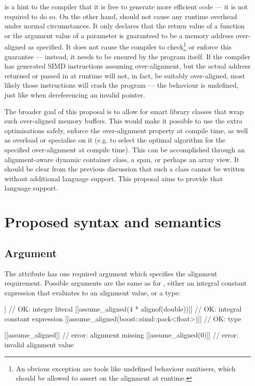  is a hint to the compiler that it is free to generate more efficient code --- it is not required to do so. On the other hand,  should not cause any runtime overhead under normal circumstances. It only declares that the return value of a function or the argument value of a parameter is guaranteed to be a memory address over-aligned as specified. It does not cause the compiler to check\footnote{An obvious exception are tools like undefined behaviour sanitisers, which should be allowed to assert on the alignment at runtime.}   or enforce this guarantee --- instead, it needs to be ensured by the program itself. If the compiler has generated SIMD instructions assuming over-alignment, but the actual address returned or passed in at runtime will not, in fact, be suitably over-aligned, most likely those instructions will crash the program --- the behaviour is undefined, just like when dereferencing an invalid pointer.

The broader goal of this proposal is to allow for smart library classes that wrap such over-aligned memory buffers. This would make it possible to use the extra optimisations safely, enforce the over-alignment property at compile time, as well as overload or specialise on it (e.g. to select the optimal algorithm for the specified over-alignment at compile time). This can be accomplished through an alignment-aware dynamic container class, a span, or perhaps an array view. It should be clear from the previous discussion that such a class cannot be written without additional language support. This proposal aims to provide that language support.

\section{Proposed syntax and semantics}

\subsection{Argument}
The attribute  has one required argument which specifies the alignment requirement. Possible arguments are the same as for , either an integral constant expression that evaluates to an alignment value, or a type:

\begin{codeblock}
[[assume_aligned(64)]]                          // OK: integer literal
[[assume_aligned(4 * alignof(double))]]         // OK: integral constant expression
[[assume_aligned(boost::simd::pack<float>)]]    // OK: type

[[assume_aligned]]       // error: alignment missing
[[assume_aligned(0)]]    // error: invalid alignment value

\end{codeblock}

